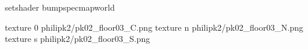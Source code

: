 setshader bumpspecmapworld

texture 0 philipk2/pk02_floor03_C.png
texture n philipk2/pk02_floor03_N.png
texture s philipk2/pk02_floor03_S.png

